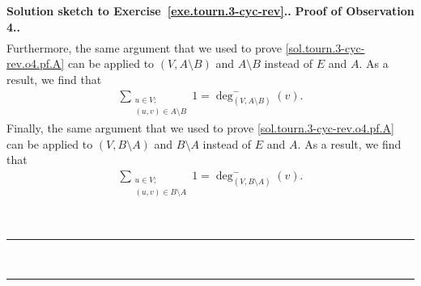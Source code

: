 \documentclass[numbers=enddot,12pt,final,onecolumn,notitlepage]{scrartcl}%
\theoremstyle{definition}
\newenvironment{proof}[1][Proof]{\noindent\textbf{#1.} }{\ \rule{0.5em}{0.5em}}
\let\sumnonlimits\sum
\renewcommand{\sum}{\sumnonlimits\limits}
\newcommand{\tup}[1]{\left( #1 \right)}
\begin{document}
\begin{proof}[Solution sketch to Exercise~\ref{exe.tourn.3-cyc-rev}.]
\begin{proof}[Proof of Observation 4.]
\begin{align}
\label{sol.tourn.3-cyc-rev.o4.pf.B}
\end{align}
Furthermore, the same argument that we used to prove
\eqref{sol.tourn.3-cyc-rev.o4.pf.A} can be applied to
$\tup{V, A \setminus B}$ and $A \setminus B$ instead of $E$ and $A$.
As a result, we find that
\begin{align}
\sum_{\substack{u \in V;\\ \tup{u, v} \in A \setminus B}} 1
= \deg^-_{\tup{V, A\setminus B}} \tup{v} .
\label{sol.tourn.3-cyc-rev.o4.pf.A-B}
\end{align}
Finally, the same argument that we used to prove
\eqref{sol.tourn.3-cyc-rev.o4.pf.A} can be applied to
$\tup{V, B \setminus A}$ and $B \setminus A$ instead of $E$ and $A$.
As a result, we find that
\begin{align}
\sum_{\substack{u \in V;\\ \tup{u, v} \in B \setminus A}} 1
= \deg^-_{\tup{V, B\setminus A}} \tup{v} .
\label{sol.tourn.3-cyc-rev.o4.pf.B-A}
\end{align}


\end{proof}
\end{proof}
\end{document}
